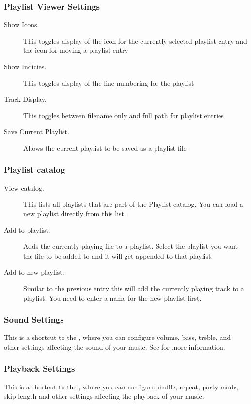 \subsubsection{Playlist Viewer Settings}
  \begin{description}
    \item[Show Icons.] This toggles display of the icon for the currently 
    selected playlist entry and the icon for moving a playlist entry
    \item[Show Indicies.] This toggles display of the line numbering for
       the playlist
    \item[Track Display.] This toggles between filename only and full path
       for playlist entries
    \item[Save Current Playlist.] Allows the current playlist to be saved as
       a  playlist file
  \end{description}

    
\subsubsection{Playlist catalog}
  \begin{description}
    \item [View catalog.] This lists all playlists that are part of the
    Playlist catalog. You can load a new playlist directly from this list.
    \item [Add to playlist.] Adds the currently playing file to a playlist.
    Select the playlist you want the file to be added to and it will get
    appended to that playlist.
    \item [Add to new playlist.] Similar to the previous entry this will
    add the currently playing track to a playlist. You need to enter a name
    for the new playlist first.
  \end{description}

\subsubsection{Sound Settings}
This is a shortcut to the , where you can configure volume,
bass, treble, and other settings affecting the sound of your music.  
See  for more information.

\subsubsection{Playback Settings}
This is a shortcut to the , where you can configure shuffle,
repeat, party mode, skip length and other settings affecting the playback of your music.  

